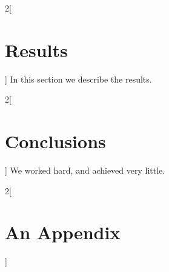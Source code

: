 \documentclass[a4paper, 11pt, oneside]{article/HSR}  %
\begin{document}
  \begin{multicols}{2}[\section{Results}]
    \label{results}
    In this section we describe the results.
    \Blindtext
  \end{multicols}

  \begin{multicols}{2}[\section{Conclusions}]
    \label{conclusions}
    We worked hard, and achieved very little.
    \Blindtext
  \end{multicols}



  \appendix %




  \begin{multicols}{2}[\section{An Appendix}]
    \label{an_appendix}
    \Blindtext
  \end{multicols}



\end{document}
